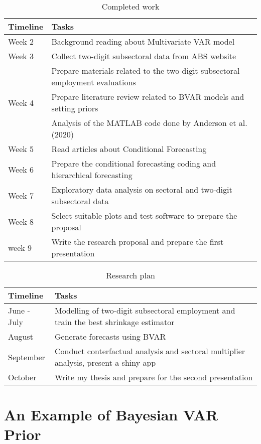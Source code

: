 \documentclass{monashthesis}
\begin{document}
\begin{table}

\caption{\label{tab:timeline1}Completed work}
\centering
\begin{tabular}[t]{ll}
\toprule
Timeline & Tasks\\
\midrule
Week 2 & Background reading about Multivariate VAR model\\
Week 3 & Collect two-digit subsectoral data from ABS website\\
 & Prepare materials related to the two-digit subsectoral employment evaluations\\
Week 4 & Prepare literature review related to BVAR models and setting priors\\
 & Analysis of the MATLAB code done by Anderson et al. (2020)\\
\addlinespace
Week 5 & Read articles about Conditional Forecasting\\
Week 6 & Prepare the conditional forecasting coding and hierarchical forecasting\\
Week 7 & Exploratory data analysis on sectoral and two-digit subsectoral data\\
Week 8 & Select suitable plots and test software to prepare the proposal\\
week 9 & Write the research proposal and prepare the first presentation\\
\bottomrule
\end{tabular}
\end{table}

\begin{table}

\caption{\label{tab:timeline2}Research plan}
\centering
\begin{tabular}[t]{ll}
\toprule
Timeline & Tasks\\
\midrule
June - July & Modelling of two-digit subsectoral employment and train the best shrinkage estimator\\
August & Generate forecasts using BVAR\\
September & Conduct conterfactual analysis and sectoral multiplier analysis, present a shiny app\\
October & Write my thesis and prepare for the second presentation\\
\bottomrule
\end{tabular}
\end{table}

\appendix

\hypertarget{an-example-of-bayesian-var-prior}{%
\chapter{An Example of Bayesian VAR Prior}\label{an-example-of-bayesian-var-prior}}
\end{document}
